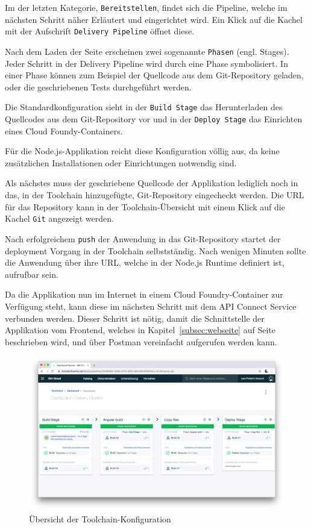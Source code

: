 Im der letzten Kategorie, \texttt{Bereitstellen}, findet sich die Pipeline, welche im nächsten Schritt näher Erläutert
und eingerichtet wird. Ein Klick auf die Kachel mit der Aufschrift \texttt{Delivery Pipeline} öffnet diese.

Nach dem Laden der Seite erscheinen zwei sogenannte \texttt{Phasen} (engl. Stages). Jeder Schritt in der Delivery Pipeline
wird durch eine Phase symbolisiert. In einer Phase können zum Beispiel der Quellcode aus dem Git-Repository geladen, oder
die geschriebenen Tests durchgeführt werden.

Die Standardkonfiguration sieht in der \texttt{Build Stage} das Herunterladen des Quellcodes aus dem Git-Repository vor
und in der \texttt{Deploy Stage} das Einrichten eines Cloud Foundy-Containers.

Für die Node.js-Applikation reicht diese Konfiguration völlig aus, da keine zusätzlichen Installationen oder Einrichtungen
notwendig sind.

Als nächstes muss der geschriebene Quellcode der Applikation lediglich noch in das, in der Toolchain hinzugefügte,
Git-Repository eingecheckt werden. Die URL für das Repository kann in der Toolchain-Übersicht mit einem Klick auf die
Kachel \texttt{Git} angezeigt werden.

Nach erfolgreichem \texttt{push} der Anwendung in das Git-Repository startet der deployment Vorgang in der Toolchain
selbstständig. Nach wenigen Minuten sollte die Anwendung über ihre URL, welche in der Node.js Runtime definiert ist,
aufrufbar sein.

Da die Applikation nun im Internet in einem Cloud Foundry-Container zur Verfügung steht, kann diese im nächsten Schritt
mit dem API Connect Service verbunden werden. Dieser Schritt ist nötig, damit die Schnittstelle der Applikation vom
Frontend, welches in Kapitel~\ref{subsec:webseite} auf Seite~\pageref{subsec:webseite} beschrieben wird, und über Postman
vereinfacht aufgerufen werden kann.

\begin{figure}[h]
    \centering
    \includegraphics[scale=0.26]{images/kapitel_3/toolchain_pipeline.png}
    \caption{Übersicht der Toolchain-Konfiguration}
    \label{fig:umsetzung_toolchain_pipeline}
\end{figure}

